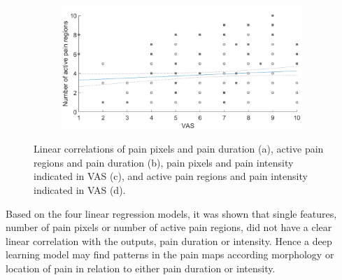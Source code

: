 \begin{figure} [b!]
\begin{tcolorbox}[colframe=black!30!black, colback=white]
\begin{subfigure}[b]{0.51\textwidth}
    \caption{}
    \label{fig:3}
  \end{subfigure}
  \hfill
  \hspace{2mm}
  \begin{subfigure}[b]{0.51\textwidth}
    \includegraphics[width=\textwidth]{Figures/vasregion}
       \caption{ }
    \label{fig:4}
  \end{subfigure}  
  \caption{Linear correlations of pain pixels and pain duration (a), active pain regions and pain duration (b), pain pixels and pain intensity indicated in VAS (c), and active pain regions and pain intensity indicated in VAS (d).}
  \label{fig:correlations}
\end{tcolorbox}
\end{figure}

\noindent
Based on the four linear regression models, it was shown that single features, number of pain pixels or number of active pain regions, did not have a clear linear correlation with the outputs, pain duration or intensity. Hence a deep learning model may find patterns in the pain maps according morphology or location of pain in relation to either pain duration or intensity. \newpage

